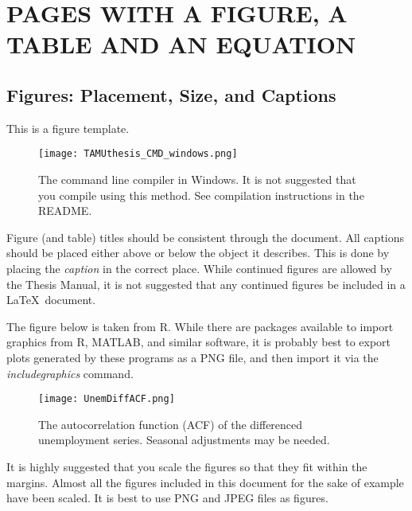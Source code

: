 %
%
%



\chapter{PAGES WITH A FIGURE, A TABLE AND AN EQUATION}
\section{Figures: Placement, Size, and Captions}
This is a figure template.
\begin{figure}[ht]
\centering
\texttt{[image: TAMUthesis\_CMD\_windows.png]}
\caption[The command line compiler in Windows.]{The command line compiler in Windows. It is not suggested that you compile using this method. See compilation instructions in the README.}

\label{fig:CMD_1}

\end{figure}

Figure (and table) titles should be consistent through the document. All captions should be placed either above or below the object it describes. This is done by placing the \textit{caption} in the correct place. While continued figures are allowed by the Thesis Manual, it is not suggested that any continued figures be included in a \LaTeX\ document.

The figure below is taken from R. While there are packages available to import graphics from R, MATLAB, and similar software, it is probably best to export plots generated by these programs as a PNG file, and then import it via the \textit{includegraphics} command.

\begin{figure}[ht]
	\centering
	\texttt{[image: UnemDiffACF.png]}
	\caption{The autocorrelation function (ACF) of the differenced unemployment series. Seasonal adjustments may be needed.}
\end{figure}

It is highly suggested that you scale the figures so that they fit within the margins. Almost all the figures included in this document for the sake of example have been scaled. It is best to use PNG and JPEG files as figures.


